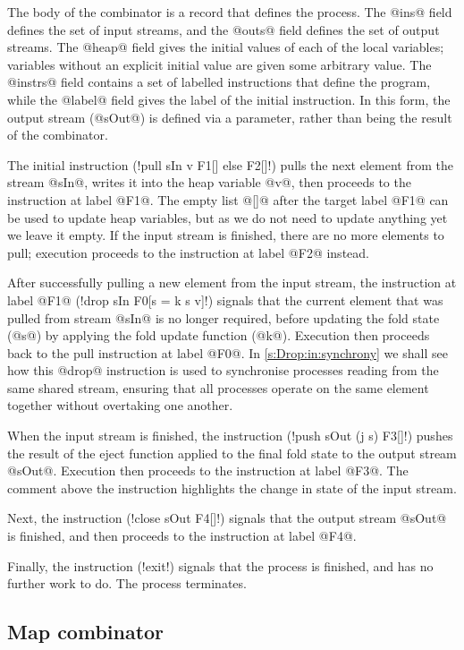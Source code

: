 The body of the combinator is a record that defines the process.
The @ins@ field defines the set of input streams, and the @outs@ field defines the set of output streams.
The @heap@ field gives the initial values of each of the local variables; variables without an explicit initial value are given some arbitrary value.
The @instrs@ field contains a set of labelled instructions that define the program, while the @label@ field gives the label of the initial instruction.
In this form, the output stream (@sOut@) is defined via a parameter, rather than being the result of the combinator.

The initial instruction (\lstiproc!pull sIn v F1[] else F2[]!) pulls the next element from the stream @sIn@, writes it into the heap variable @v@, then proceeds to the instruction at label @F1@.
The empty list @[]@ after the target label @F1@ can be used to update heap variables, but as we do not need to update anything yet we leave it empty. 
If the input stream is finished, there are no more elements to pull; execution proceeds to the instruction at label @F2@ instead.

After successfully pulling a new element from the input stream, the instruction at label @F1@ (\lstiproc!drop sIn F0[s = k s v]!) signals that the current element that was pulled from stream @sIn@ is no longer required, before updating the fold state (@s@) by applying the fold update function (@k@).
Execution then proceeds back to the pull instruction at label @F0@.
In \cref{s:Drop:in:synchrony} we shall see how this @drop@ instruction is used to synchronise processes reading from the same shared stream, ensuring that all processes operate on the same element together without overtaking one another.

When the input stream is finished, the instruction (\lstiproc!push sOut (j s) F3[]!) pushes the result of the eject function applied to the final fold state to the output stream @sOut@.
Execution then proceeds to the instruction at label @F3@.
The comment above the instruction highlights the change in state of the input stream.

Next, the instruction (\lstiproc!close sOut F4[]!) signals that the output stream @sOut@ is finished, and then proceeds to the instruction at label @F4@.

Finally, the instruction (\lstiproc!exit!) signals that the process is finished, and has no further work to do.
The process terminates.

\subsection{Map combinator}

